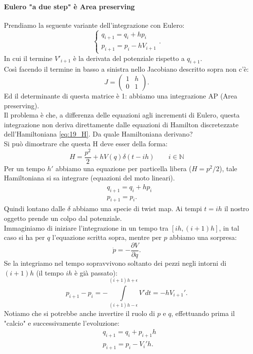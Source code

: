 \paragraph{Eulero "a due step" è Area preserving}%
\label{par:Eulero "a due step" è Area preserving}
Prendiamo la seguente variante dell'integrazione con Eulero:
\[
    \begin{cases}
        q_{i+1}=q_i + hp_i\\
	p_{i+1}=p_i - h V_{i+1}
    \end{cases}
.\] 
In cui il termine $V'_{i+1}$ è la derivata del potenziale rispetto a $q_{i+1}$. \\
Così facendo il termine in basso a sinistra nello Jacobiano descritto sopra non c'è:
\[
    J = 
    \begin{pmatrix} 
	1 & h\\
	0 & 1
    \end{pmatrix} 
.\] 
Ed il determinante di questa matrice è 1: abbiamo una integrazione AP (Area preserving).\\
Il problema è che, a differenza delle equazioni agli incrementi di Eulero, questa integrazione non deriva direttamente dalle equazioni di Hamilton discretezzate dell'Hamiltoniana \ref{eq:19_H}. Da quale Hamiltoniana derivano?\\
Si può dimostrare che questa H deve esser della forma:
\begin{equation}
    H = \frac{p^2}{2} + h V(q)\delta(t-ih) \qquad i \in \mathbb{N}
    \label{eq:19_H_poincare}
\end{equation}
Per un tempo $h'$ abbiamo una equazione per particella libera ($H=p^2 /2$), tale Hamiltoniana si sa integrare (equazioni del moto lineari).
\[\begin{aligned}
    & q_{i+1}=q_i + hp_i\\
    & p_{i+1}=p_i
.\end{aligned}\]
Quindi lontano dalle $\delta$ abbiamo una specie di twist map.
Ai tempi $t=ih$ il nostro oggetto prende un colpo dal potenziale.\\
Immaginiamo di iniziare l'integrazione in un tempo tra $\left[ih, (i+1)h\right]$, in tal caso si ha per $q$ l'equazione scritta sopra, mentre per $p$ abbiamo una sorpresa:
\[
    \dot{p} = - \frac{\partial V}{\partial q}
.\] 
Se la integriamo nel tempo sopravvivono soltanto dei pezzi negli intorni di $(i+1)h$ (il tempo $ih$ è già passato):
\[
    p_{i+1} - p_i = -\int\limits_{(i+1)h-\epsilon}^{(i+1)h+\epsilon} V' dt  = - h V_{i+1}'
.\] 
Notiamo che si potrebbe anche invertire il ruolo di $p$ e $q$, effettuando prima il "calcio" e successivamente l'evoluzione:
\[\begin{aligned}
    & q_{i+1} = q_i + p_{i+1}h\\
    & p_{i+1} = p_i - V_i'h
.\end{aligned}\]
